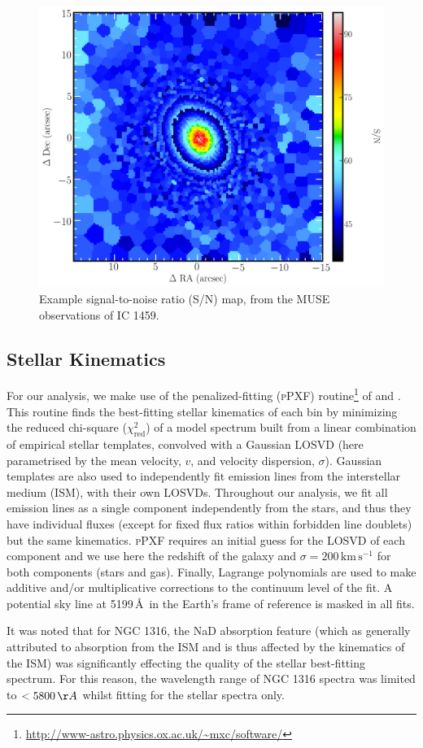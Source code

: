		\begin{figure}
			\centering
			\includegraphics[width=.6\textwidth]{chapter2/egSNR.png}
			\caption[Example signal-to-noise map]{Example signal-to-noise ratio (S/N) map, from the MUSE observations of IC 1459.}
			\label{fig:egSNR}
		\end{figure}

	\subsection{Stellar Kinematics}
		\label{subsec:StellarFit}
		For our analysis, we make use of the penalized-fitting (\textsc{pPXF}) routine\footnote{\url{http://www-astro.physics.ox.ac.uk/~mxc/software/}} of \citet{Cappellari2004} and \citet{Cappellari2016a}. This routine finds the best-fitting stellar kinematics of each bin by minimizing the reduced chi-square ($\chi^2_\text{red}$) of a model spectrum built from a linear combination of empirical stellar templates, convolved with a Gaussian LOSVD (here parametrised by the mean velocity, $v$, and velocity dispersion, $\sigma$). Gaussian templates are also used to independently fit emission lines from the interstellar medium (ISM), with their own LOSVDs. Throughout our analysis, we fit all emission lines as a single component independently from the stars, and thus they have individual fluxes (except for fixed flux ratios within forbidden line doublets) but the same kinematics. \textsc{pPXF} requires an initial guess for the LOSVD of each component and we use here the redshift of the galaxy and $\sigma = 200\,\mathrm{km\,s^{-1}}$ for both components (stars and gas). Finally, Lagrange polynomials are used to make additive and/or multiplicative corrections to the continuum level of the fit. A potential sky line at 5199\,\AA\ in the Earth's frame of reference is masked in all fits.

		It was noted that for NGC 1316, the NaD absorption feature (which as generally attributed to absorption from the ISM and is thus affected by the kinematics of the ISM) was significantly effecting the quality of the stellar best-fitting spectrum. For this reason, the wavelength range of NGC 1316 spectra was limited to $<5800 \, \AA$ whilst fitting for the stellar spectra only.  

